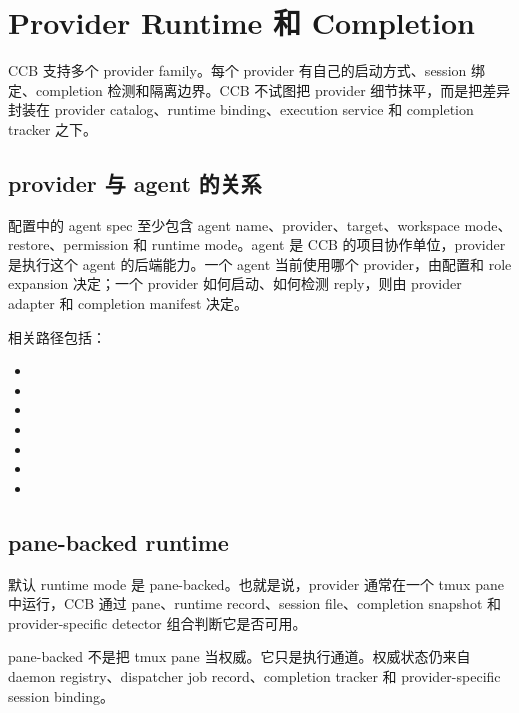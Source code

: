 \chapter{Provider Runtime 和 Completion}

CCB 支持多个 provider family。每个 provider 有自己的启动方式、session 绑定、completion 检测和隔离边界。CCB 不试图把 provider 细节抹平，而是把差异封装在 provider catalog、runtime binding、execution service 和 completion tracker 之下。

\section{provider 与 agent 的关系}

配置中的 agent spec 至少包含 agent name、provider、target、workspace mode、restore、permission 和 runtime mode。agent 是 CCB 的项目协作单位，provider 是执行这个 agent 的后端能力。一个 agent 当前使用哪个 provider，由配置和 role expansion 决定；一个 provider 如何启动、如何检测 reply，则由 provider adapter 和 completion manifest 决定。

相关路径包括：

\begin{itemize}
  \item {}
  \item {}
  \item {}
  \item {}
  \item {}
  \item {}
  \item {}
\end{itemize}

\section{pane-backed runtime}

默认 runtime mode 是 pane-backed。也就是说，provider 通常在一个 tmux pane 中运行，CCB 通过 pane、runtime record、session file、completion snapshot 和 provider-specific detector 组合判断它是否可用。

pane-backed 不是把 tmux pane 当权威。它只是执行通道。权威状态仍来自 daemon registry、dispatcher job record、completion tracker 和 provider-specific session binding。

